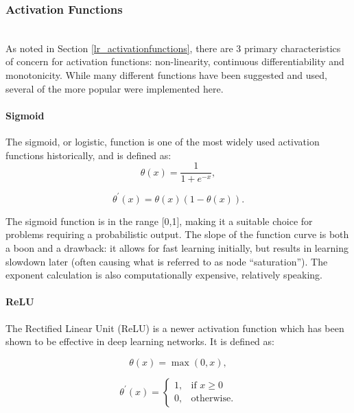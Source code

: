 \documentclass[a4paper,11pt,oneside]{article}
\theoremstyle{plain}
\theoremstyle{definition}
\begin{document}
	\subsubsection{Activation Functions}\label{imp_activation_functions}
	~\\
	As noted in Section \ref{lr_activationfunctions}, there are 3 primary characteristics of concern for activation functions: non-linearity, continuous differentiability and monotonicity. While many different functions have been suggested and used, several of the more popular were implemented here.
	
	\paragraph{Sigmoid}
	
	The sigmoid, or logistic, function is one of the most widely used activation functions historically, and is defined as:
	\begin{equation}\label{func_sigmoid}
	\theta(x) = \frac{1}{1 + e^{-x}}, 
	\end{equation}
	
	\begin{equation}\label{func_sigmoidprime}
	\theta^\prime(x) = \theta(x)(1-\theta(x)).
	\end{equation}
	
	The sigmoid function is in the range [0,1], making it a suitable choice for problems requiring a probabilistic output. The slope of the function curve is both a boon and a drawback: it allows for fast learning initially, but results in learning slowdown later (often causing what is referred to as node ``saturation''). The exponent calculation is also computationally expensive, relatively speaking.
	
	\paragraph{ReLU}
	
	The Rectified Linear Unit (ReLU) is a newer activation function which has been shown to be effective in deep learning networks. It is defined as:
	
	\begin{equation}\label{func_relu}
	\theta(x) = \max(0, x), 
	\end{equation}
	
	\[
	\theta^\prime(x)= 
	\begin{cases}
	1,& \text{if } x\geq 0\\
	0,              & \text{otherwise.}
	\end{cases}
	\]\begin{equation}\end{equation}\label{func_relu_prime}
	
\end{document}
